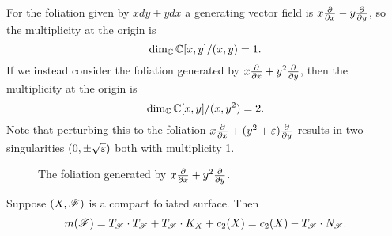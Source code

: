 \begin{example}
    For the foliation given by $xdy+ydx$ a generating vector field is
    $x\pdv{}{x}-y\pdv{}{y}$, so the multiplicity at the origin is
    \begin{equation*}
        \dim_{\mathbb{C}}\mathbb{C}[x,y]/(x,y) = 1.
    \end{equation*}
    If we instead consider the foliation generated by $x\pdv{}{x}+y^2\pdv{}{y}$,
    then the multiplicity at the origin is
    \begin{equation*}
        \dim_{\mathbb{C}}\mathbb{C}[x,y]/(x,y^2) = 2.
    \end{equation*}
    Note that perturbing this to the foliation $x\pdv{}{x}+(y^2+\varepsilon)\pdv{}{y}$
    results in two singularities $(0,\pm\sqrt{\varepsilon})$ both with multiplicity 1.
    \begin{figure}[H]
        \centering
        \caption{The foliation generated by $x\pdv{}{x}+y^2\pdv{}{y}$.}
        \label{fig:saddle-node}
    \end{figure}
\end{example}

\begin{proposition}\label{prop:multiplicity}
    Suppose $(X,\mathscr{F})$ is a compact foliated surface. Then
    \begin{align*}
        m(\mathscr{F})
            = T_{\mathscr{F}}\cdot T_{\mathscr{F}} + T_{\mathscr{F}}\cdot K_X + c_2(X)
            = c_2(X) - T_{\mathscr{F}}\cdot N_{\mathscr{F}}.
    \end{align*}
\end{proposition}

